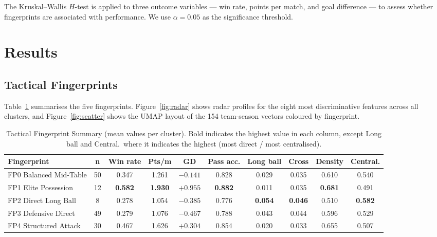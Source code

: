 \documentclass[runningheads]{llncs}
\begin{document}
The Kruskal--Wallis $H$-test is applied to three outcome variables --- win rate, points per match, and goal difference --- to assess whether fingerprints are associated with performance. We use $\alpha = 0.05$ as the significance threshold.

\section{Results}

\subsection{Tactical Fingerprints}

Table~\ref{tab:fingerprints} summarises the five fingerprints. Figure~\ref{fig:radar} shows radar profiles for the eight most discriminative features across all clusters, and Figure~\ref{fig:scatter} shows the UMAP layout of the 154 team-season vectors coloured by fingerprint.

\begin{table}[t]
\caption{Tactical Fingerprint Summary (mean values per cluster). Bold indicates the highest value in each column, except Long ball and Central.\ where it indicates the highest (most direct / most centralised).}\label{tab:fingerprints}
\centering
\small
\begin{tabular}{|l|c|c|c|c|c|c|c|c|c|}
\hline
\textbf{Fingerprint} & \textbf{n} & \textbf{Win rate} & \textbf{Pts/m} & \textbf{GD} & \textbf{Pass acc.} & \textbf{Long ball} & \textbf{Cross} & \textbf{Density} & \textbf{Central.} \\
\hline
FP0 Balanced Mid-Table  & 50 & 0.347          & 1.261          & $-0.141$          & 0.828          & 0.029          & 0.035          & 0.610          & 0.540 \\
FP1 Elite Possession    & 12 & \textbf{0.582} & \textbf{1.930} & $\mathbf{+0.955}$ & \textbf{0.882} & 0.011          & 0.035          & \textbf{0.681} & 0.491 \\
FP2 Direct Long Ball    & 8  & 0.278          & 1.054          & $-0.385$          & 0.776          & \textbf{0.054} & \textbf{0.046} & 0.510          & \textbf{0.582} \\
FP3 Defensive Direct    & 49 & 0.279          & 1.076          & $-0.467$          & 0.788          & 0.043          & 0.044          & 0.596          & 0.529 \\
FP4 Structured Attack   & 30 & 0.467          & 1.626          & $+0.304$          & 0.854          & 0.020          & 0.033          & 0.655          & 0.507 \\
\hline
\end{tabular}
\end{table}
\end{document}
